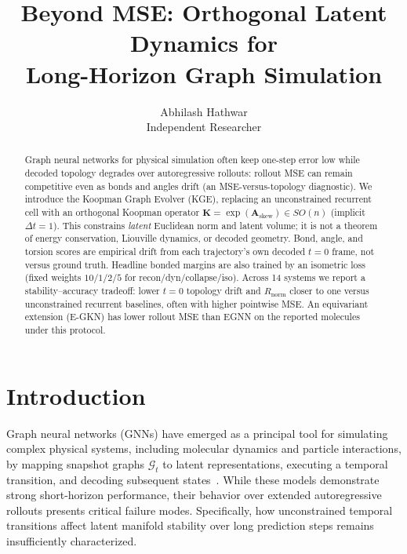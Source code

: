 \documentclass{article}
\title[Orthogonal Latent Dynamics for Graph Simulation]{Beyond MSE: Orthogonal Latent Dynamics for\\
Long-Horizon Graph Simulation}
\author[Abhilash Hathwar]{%
  Abhilash Hathwar\\
  Independent Researcher\\
  \email{abhilashhathwar20@gmail.com}
}
\begin{document}
\maketitle

\begin{abstract}
Graph neural networks for physical simulation often keep one-step error low while decoded topology degrades over autoregressive rollouts: rollout MSE can remain competitive even as bonds and angles drift (an MSE-versus-topology diagnostic). We introduce the Koopman Graph Evolver (KGE), replacing an unconstrained recurrent cell with an orthogonal Koopman operator $\mathbf{K}=\exp(\mathbf{A}_{\mathrm{skew}})\in SO(n)$ (implicit $\Delta t=1$). This constrains \emph{latent} Euclidean norm and latent volume; it is not a theorem of energy conservation, Liouville dynamics, or decoded geometry. Bond, angle, and torsion scores are empirical drift from each trajectory's own decoded $t=0$ frame, not versus ground truth. Headline bonded margins are also trained by an isometric loss (fixed weights $10/1/2/5$ for recon/dyn/collapse/iso). Across 14 systems we report a stability--accuracy tradeoff: lower $t=0$ topology drift and $R_{\mathrm{norm}}$ closer to one versus unconstrained recurrent baselines, often with higher pointwise MSE. An equivariant extension (E-GKN) has lower rollout MSE than EGNN on the reported molecules under this protocol.\end{abstract}

\section{Introduction}
\label{sec:intro}

Graph neural networks (GNNs) have emerged as a principal tool for simulating complex physical systems, including molecular dynamics and particle interactions, by mapping snapshot graphs $\mathcal{G}_t$ to latent representations, executing a temporal transition, and decoding subsequent states~\citep{bronstein2021geometric}. While these models demonstrate strong short-horizon performance, their behavior over extended autoregressive rollouts presents critical failure modes. Specifically, how unconstrained temporal transitions affect latent manifold stability over long prediction steps remains insufficiently characterized.
\end{document}
